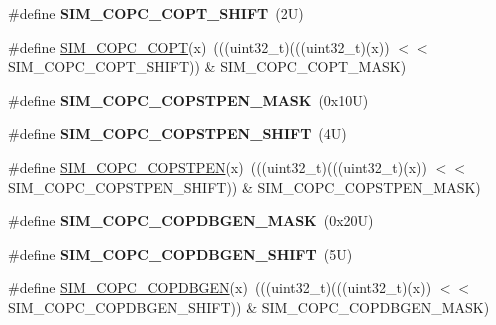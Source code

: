 \begin{DoxyCompactItemize}
\mbox{\label{group___s_i_m___register___masks_gafc24142fbaab3d1f12a325df24e7887f}} 
\#define {\bfseries S\+I\+M\+\_\+\+C\+O\+P\+C\+\_\+\+C\+O\+P\+T\+\_\+\+S\+H\+I\+FT}~(2\+U)
\item 
\#define \mbox{\hyperlink{group___s_i_m___register___masks_ga79aa2a249c90720120834eae00f8bd27}{S\+I\+M\+\_\+\+C\+O\+P\+C\+\_\+\+C\+O\+PT}}(x)~(((uint32\+\_\+t)(((uint32\+\_\+t)(x)) $<$$<$ S\+I\+M\+\_\+\+C\+O\+P\+C\+\_\+\+C\+O\+P\+T\+\_\+\+S\+H\+I\+FT)) \& S\+I\+M\+\_\+\+C\+O\+P\+C\+\_\+\+C\+O\+P\+T\+\_\+\+M\+A\+SK)
\item 
\mbox{\label{group___s_i_m___register___masks_ga4391ab84767cd1b75e18fecac03eb43e}} 
\#define {\bfseries S\+I\+M\+\_\+\+C\+O\+P\+C\+\_\+\+C\+O\+P\+S\+T\+P\+E\+N\+\_\+\+M\+A\+SK}~(0x10\+U)
\item 
\mbox{\label{group___s_i_m___register___masks_gab1e73e314cf6c3b208b9394dda5c4484}} 
\#define {\bfseries S\+I\+M\+\_\+\+C\+O\+P\+C\+\_\+\+C\+O\+P\+S\+T\+P\+E\+N\+\_\+\+S\+H\+I\+FT}~(4\+U)
\item 
\#define \mbox{\hyperlink{group___s_i_m___register___masks_gade681bda3a2b1ad66d752b04f66f8192}{S\+I\+M\+\_\+\+C\+O\+P\+C\+\_\+\+C\+O\+P\+S\+T\+P\+EN}}(x)~(((uint32\+\_\+t)(((uint32\+\_\+t)(x)) $<$$<$ S\+I\+M\+\_\+\+C\+O\+P\+C\+\_\+\+C\+O\+P\+S\+T\+P\+E\+N\+\_\+\+S\+H\+I\+FT)) \& S\+I\+M\+\_\+\+C\+O\+P\+C\+\_\+\+C\+O\+P\+S\+T\+P\+E\+N\+\_\+\+M\+A\+SK)
\item 
\mbox{\label{group___s_i_m___register___masks_ga05a25ca10cd9ea7e14e71500aa9e2400}} 
\#define {\bfseries S\+I\+M\+\_\+\+C\+O\+P\+C\+\_\+\+C\+O\+P\+D\+B\+G\+E\+N\+\_\+\+M\+A\+SK}~(0x20\+U)
\item 
\mbox{\label{group___s_i_m___register___masks_gabdb55843930e88cf0819ec86d511ecee}} 
\#define {\bfseries S\+I\+M\+\_\+\+C\+O\+P\+C\+\_\+\+C\+O\+P\+D\+B\+G\+E\+N\+\_\+\+S\+H\+I\+FT}~(5\+U)
\item 
\#define \mbox{\hyperlink{group___s_i_m___register___masks_ga304f13cb0a7ea7666e2e1d713cc30482}{S\+I\+M\+\_\+\+C\+O\+P\+C\+\_\+\+C\+O\+P\+D\+B\+G\+EN}}(x)~(((uint32\+\_\+t)(((uint32\+\_\+t)(x)) $<$$<$ S\+I\+M\+\_\+\+C\+O\+P\+C\+\_\+\+C\+O\+P\+D\+B\+G\+E\+N\+\_\+\+S\+H\+I\+FT)) \& S\+I\+M\+\_\+\+C\+O\+P\+C\+\_\+\+C\+O\+P\+D\+B\+G\+E\+N\+\_\+\+M\+A\+SK)
$$
\end{DoxyCompactItemize}
